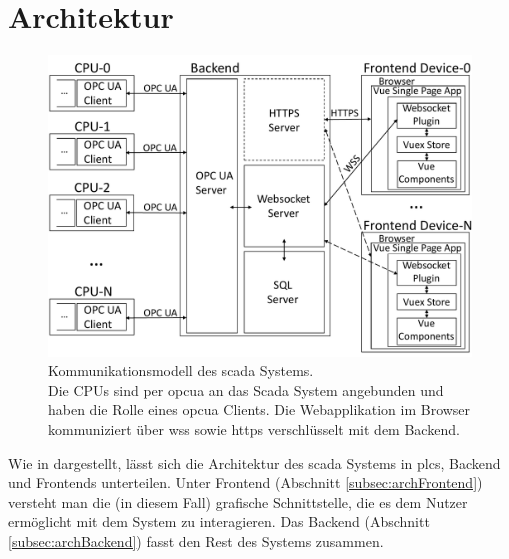 \section{Architektur}\label{sec:arch}

\begin{figure}[ht]
		\centering
		\includegraphics[width=\textwidth]{content/hauptteil/systemEntwurf/res/comMod.pdf}
    \caption[Kommunikationsmodell des \acs{scada} Systems]{Kommunikationsmodell des \acs{scada} Systems.\\
      Die CPUs sind per \acs{opcua} an das Scada System angebunden und haben die Rolle eines \acs{opcua} Clients.
      Die Webapplikation im Browser kommuniziert über \acs{wss} sowie \acs{https} verschlüsselt mit dem Backend.}
		\label{img:comMod}
\end{figure}
Wie in  dargestellt, lässt sich die Architektur des \ac{scada} Systems in \acp{plc}, Backend und Frontends unterteilen.
Unter Frontend (Abschnitt \ref{subsec:archFrontend}) versteht man die (in diesem Fall) grafische Schnittstelle, 
die es dem Nutzer ermöglicht mit dem System zu interagieren.
Das Backend (Abschnitt \ref{subsec:archBackend}) fasst den Rest des Systems zusammen.

